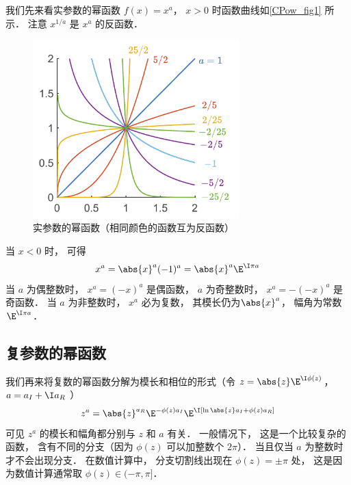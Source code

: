
我们先来看实参数的幂函数 $f(x) = x^a$， $x > 0$ 时函数曲线如\autoref{CPow_fig1} 所示． 注意 $x^{1/a}$ 是 $x^a$ 的反函数．
\begin{figure}[ht]
\centering
\includegraphics[width=8cm]{./figures/CPow1.pdf}
\caption{实参数的幂函数（相同颜色的函数互为反函数）} \label{CPow_fig1}
\end{figure}

当 $x < 0$ 时， 可得
\begin{equation}
x^a = \abs{x}^a (-1)^a = \abs{x}^a\E^{\I\pi a}
\end{equation}
当 $a$ 为偶整数时， $x^a = (-x)^a$ 是偶函数， $a$ 为奇整数时， $x^a = -(-x)^a$ 是奇函数． 当 $a$ 为非整数时， $x^a$ 必为复数， 其模长仍为$\abs{x}^a$， 幅角为常数 $\E^{\I\pi a}$．

\subsection{复参数的幂函数}
我们再来将复数的幂函数分解为模长和相位的形式（令 $z = \abs{z} \E^{\I\phi(z)}$， $a = a_I + \I a_R$ ）
\begin{equation}
z^a = \abs{z}^{a_R} \E^{-\phi(z) a_I} \E^{\I[\ln\abs{z}a_I + \phi(z)a_R]}
\end{equation}
可见 $z^a$ 的模长和幅角都分别与 $z$ 和 $a$ 有关． 一般情况下， 这是一个比较复杂的函数， 含有不同的分支（因为 $\phi(z)$ 可以加整数个 $2\pi$）．%
当且仅当 $a$ 为整数时才不会出现分支． 在数值计算中， 分支切割线出现在 $\phi(z) = \pm\pi$ 处， 这是因为数值计算通常取 $\phi(z)\in(-\pi, \pi]$．
